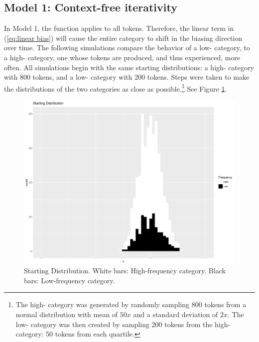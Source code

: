 \subsection{\label{subsec:Model-1:-Context-Free}Model 1: Context-free iterativity}

In Model 1, the  function applies to all tokens. Therefore, the
linear  term in (\ref{eq:linear bias}) will cause the entire
category to shift in the biasing direction over time. The following
simulations compare the behavior of a low- category, to a
high- category, one whose tokens are produced, and thus experienced,
more often. All simulations begin with the same starting distributions:
a high- category with 800 tokens, and a low- category
with 200 tokens. Steps were taken to make the distributions of the
two categories as close as possible.\footnote{The high- category was generated by randomly sampling 800
tokens from a normal distribution with mean of $50x$ and a standard
deviation of $2x$. The low- category was then created by
sampling 200 tokens from the high- category: 50 tokens from
each quartile.} See Figure \ref{fig:Frequency Starting Dist}. 

\begin{figure}[H]
\centering{}\includegraphics[scale=0.25]{figures/startCon.pdf}\caption{\label{fig:Frequency Starting Dist}Starting Distribution. White bars:
High-frequency category. Black bars: Low-frequency category.}
\end{figure}

